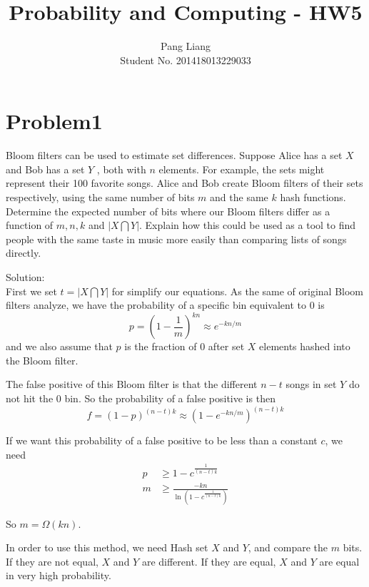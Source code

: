 \documentclass[12pt]{article}
\title{Probability and Computing - HW5}
\author{Pang Liang\\ Student No. 201418013229033}
\begin{document}
\maketitle

\section{Problem1}
Bloom filters can be used to estimate set differences. Suppose Alice has a set $X$ and Bob has a set $Y$ , both with $n$ elements. For example, the sets might represent their 100 favorite songs. Alice and Bob create Bloom filters of their sets respectively, using the same number of bits $m$ and the same $k$ hash functions. Determine the expected number of bits where our Bloom filters differ as a function of $m, n, k$ and $|X \bigcap Y|$. Explain how this could be used as a tool to find people with the same taste in music more easily than comparing lists of songs directly.

Solution:\\
First we set $t=|X \bigcap Y|$ for simplify our equations. As the same of original Bloom filters analyze, we have the probability of a specific bin equivalent to 0 is 
\begin{equation}
    p = (1-\frac{1}{m})^{kn} \approx e^{-kn/m}
\end{equation}
and we also assume that $p$ is the fraction of 0 after set $X$ elements hashed into the Bloom filter.

The false positive of this Bloom filter is that the different $n-t$ songs in set $Y$ do not hit the 0 bin. So the probability of a false positive is then
\begin{equation}
    f = (1-p)^{(n-t)k} \approx (1-e^{-kn/m})^{(n-t)k}
\end{equation}

If we want this probability of a false positive to be less than a constant $c$, we need
\begin{equation}
    \begin{split}
    p &\ge 1 - c^{\frac{1}{(n-t)k}}\\
    m &\ge \frac{-kn}{\ln (1-c^{\frac{1}{(n-t)k}})}
    \end{split}
\end{equation}

So $m=\Omega(kn)$. 

In order to use this method, we need Hash set $X$ and $Y$, and compare the $m$ bits. If they are not equal, $X$ and $Y$ are different. If they are equal, $X$ and $Y$ are equal in very high probability.
\end{document}
